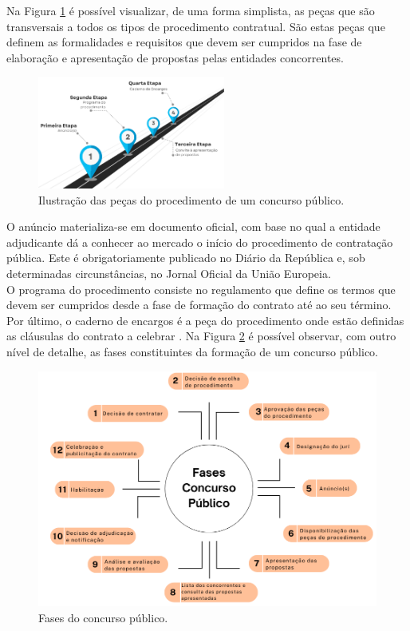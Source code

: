 Na Figura \ref{fig:pecas} é possível visualizar, de uma forma simplista, as peças que são transversais a todos os tipos de procedimento contratual. 
São estas peças que definem as formalidades e requisitos que devem ser cumpridos na fase de elaboração e apresentação de propostas pelas entidades concorrentes. 
\begin{figure}[H]
	\centering
	\includegraphics[width=0.55\textwidth]{imagens/pecasprocedimento.png}
	\caption{Ilustração das peças do procedimento de um concurso público.}
	\label{fig:pecas}
\end{figure}


O anúncio materializa-se em documento oficial, com base no qual a entidade adjudicante dá a conhecer ao mercado o início do procedimento de contratação pública. Este é obrigatoriamente publicado no Diário da República e, sob determinadas circunstâncias, no Jornal Oficial da União Europeia. \\
O programa do procedimento consiste no regulamento que define os termos que devem ser cumpridos desde a fase de formação do contrato até ao seu término\cite{programaproc}. \\
Por último, o caderno de encargos é a peça do procedimento onde estão definidas as cláusulas do contrato a celebrar \cite{caderno}. 
Na Figura \ref{fig:fasescp} é possível observar, com outro nível de detalhe, as fases constituintes da formação de um concurso público. 

\begin{figure}[H]
	\centering
	\includegraphics[width=.8\textwidth]{imagens/fasesconcpub.png}
	\caption{Fases do concurso público.}
	\label{fig:fasescp}
\end{figure}



